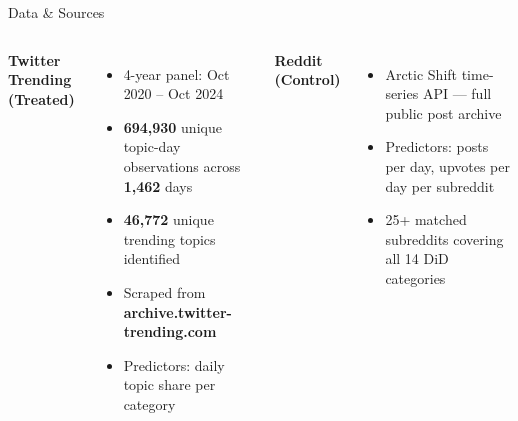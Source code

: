 \documentclass[aspectratio=169,t]{beamer}
\newcommand{\orange}[1]{\textcolor{uteporange}{\textbf{#1}}}
\newcommand{\blue}[1]{\textcolor{utepblue}{\textbf{#1}}}
\begin{document}
\begin{frame}{Data \& Sources}
\begin{columns}[T]
    \blue{Twitter Trending (Treated)}
    \begin{itemize}\setlength\itemsep{0.35em}\small
      \item 4-year panel: Oct 2020 – Oct 2024
      \item \orange{694,930} unique topic-day observations across \orange{1,462} days
      \item \orange{46,772} unique trending topics identified
      \item Scraped from \orange{archive.twitter-trending.com}
      \item Predictors: daily topic share per category
    \end{itemize}

    \blue{Reddit (Control)}
    \begin{itemize}\setlength\itemsep{0.35em}\small
      \item Arctic Shift time-series API — full public post archive
      \item Predictors: posts per day, upvotes per day per subreddit
      \item 25+ matched subreddits covering all 14 DiD categories
    \end{itemize}
\end{columns}
\end{frame}
\end{document}
